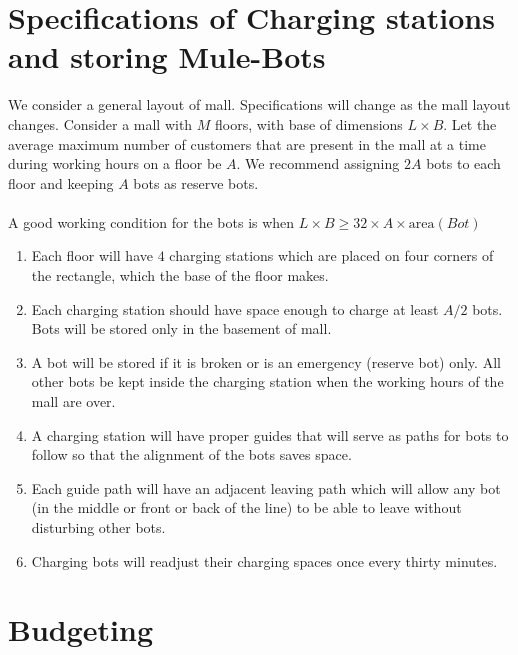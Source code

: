 \documentclass{article}
\begin{document}
\section{Specifications of Charging stations and storing Mule-Bots}
We consider a general layout of mall. Specifications will change as the mall layout changes. Consider a mall with $M$ floors, with base of dimensions 
$L \times B$. Let the average maximum number of customers that are present in the mall at a time during working hours on a floor be $A$. We recommend assigning $2A$ bots to each floor and keeping $A$ bots as reserve bots.\\ \\
A good working condition for the bots is when $L\times B \geq 32\times A\times \text{area}(Bot)$\\
\begin{enumerate}
    \item Each floor will have $4$ charging stations which are placed on four corners of the rectangle, which the base of the floor makes.
    \item Each charging station should have space enough to charge at least $A/2$ bots. Bots will be stored only in the basement of mall.
    \item A bot will be stored if it is broken or is an emergency (reserve bot) only. All other bots be kept inside the charging station when the working hours of the mall are over.
    \item A charging station will have proper guides that will serve as paths for bots to follow so that the alignment of the bots saves space.
    \item Each guide path will have an adjacent leaving path which will allow any bot (in the middle or front or back of the line) to be able to leave without disturbing other bots.
    \item  Charging bots will readjust their charging spaces once every thirty minutes.
\end{enumerate}
\section{Budgeting}
\end{document}

